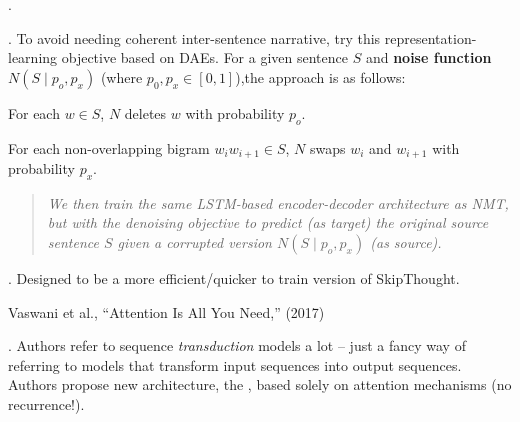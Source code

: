 \documentclass[11pt]{article}
\begin{document}
\myspace
\p {}. 
\begin{compactitem}
	\item {}. To avoid needing coherent inter-sentence narrative, try this representation-learning objective based on DAEs. For a given sentence $S$ and \textbf{noise function} $N(S \mid p_o, p_x)$ (where $p_0, p_x \in [0, 1]$),the approach is as follows:
	\begin{compactenum}
		\item For each $w \in S$, $N$ deletes $w$ with probability $p_o$.
		\item For each non-overlapping bigram $w_iw_{i + 1} \in S$, $N$ swaps $w_i$ and $w_{i + 1}$ with probability $p_x$.
	\end{compactenum}
	\begin{quote}
		{\footnotesize \textit{
				We then train the same LSTM-based encoder-decoder architecture as NMT, but with the denoising objective to predict (as target) the original source sentence $S$ given a corrupted version $N(S \mid p_o, p_x)$ (as source).
		}}
	\end{quote}
	
	\item {}. Designed to be a more efficient/quicker to train version of SkipThought.
\end{compactitem}








\vspace{-1em}
{\footnotesize Vaswani et al., ``Attention Is All You Need,'' (2017)}

\p {}. Authors refer to sequence \textit{transduction} models a lot -- just a fancy way of referring to models that transform input sequences into output sequences. Authors propose new architecture, the , based solely on attention mechanisms (no recurrence!). 
\end{document}
